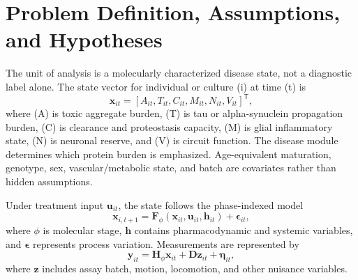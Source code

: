 \documentclass[conference]{IEEEtran}
\begin{document}
\begin{table}[t]
\caption{Idea route audit}
\label{tab:audit}
\centering
\scriptsize
\setlength{\tabcolsep}{2pt}
\end{table}

\section{Problem Definition, Assumptions, and Hypotheses}
The unit of analysis is a molecularly characterized disease state, not a diagnostic label alone. The state vector for individual or culture (i) at time (t) is
\begin{equation}
\mathbf{x}_{it}=[A_{it},T_{it},C_{it},M_{it},N_{it},V_{it}]^{\mathsf T},
\label{eq:state}
\end{equation}
where (A) is toxic aggregate burden, (T) is tau or alpha-synuclein propagation burden, (C) is clearance and proteostasis capacity, (M) is glial inflammatory state, (N) is neuronal reserve, and (V) is circuit function. The disease module determines which protein burden is emphasized. Age-equivalent maturation, genotype, sex, vascular/metabolic state, and batch are covariates rather than hidden assumptions.

Under treatment input \(\mathbf{u}_{it}\), the state follows the phase-indexed model
\begin{equation}
\mathbf{x}_{i,t+1}=\mathbf{F}_{\phi}(\mathbf{x}_{it},\mathbf{u}_{it},\mathbf{h}_{it})+\boldsymbol{\epsilon}_{it},
\label{eq:dynamics}
\end{equation}
where \(\phi\) is molecular stage, \(\mathbf{h}\) contains pharmacodynamic and systemic variables, and \(\boldsymbol{\epsilon}\) represents process variation. Measurements are represented by
\begin{equation}
\mathbf{y}_{it}=\mathbf{H}_{\phi}\mathbf{x}_{it}+\mathbf{D}\mathbf{z}_{it}+\boldsymbol{\eta}_{it},
\label{eq:observation}
\end{equation}
where \(\mathbf{z}\) includes assay batch, motion, locomotion, and other nuisance variables.
\end{document}
